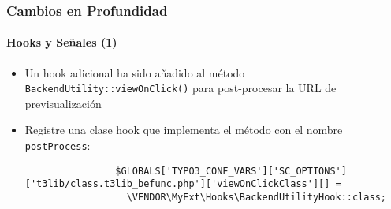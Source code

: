 \begin{frame}[fragile]
	\frametitle{Cambios en Profundidad}
	\framesubtitle{Hooks y Señales (1)}

	\lstset{basicstyle=\tiny\ttfamily}

	\begin{itemize}

		\item Un hook adicional ha sido añadido al método \texttt{BackendUtility::viewOnClick()}
			para post-procesar la URL de previsualización

		\item Registre una clase hook que implementa el método con el nombre \texttt{postProcess}:

			\begin{lstlisting}
				$GLOBALS['TYPO3_CONF_VARS']['SC_OPTIONS']['t3lib/class.t3lib_befunc.php']['viewOnClickClass'][] =
				  \VENDOR\MyExt\Hooks\BackendUtilityHook::class;
			\end{lstlisting}

	\end{itemize}

\end{frame}


